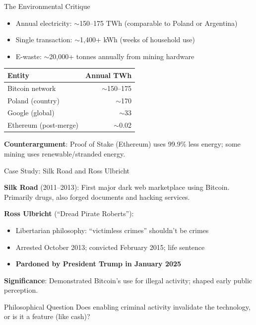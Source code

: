 ﻿\documentclass[aspectratio=169,11pt]{beamer}
\begin{document}
\begin{frame}{The Environmental Critique}
\begin{objectionbox}
\small
\begin{itemize}
    \item Annual electricity: $\sim$150--175 TWh (comparable to Poland or Argentina)
    \item Single transaction: $\sim$1,400+ kWh (weeks of household use)
    \item E-waste: $\sim$20,000+ tonnes annually from mining hardware
\end{itemize}
\end{objectionbox}

\vspace{-0.2em}
\begin{table}[h]
\centering
\scriptsize
\begin{tabular}{@{}lr@{}}
\toprule
\textbf{Entity} & \textbf{Annual TWh} \\
\midrule
Bitcoin network & $\sim$150--175 \\
Poland (country) & $\sim$170 \\
Google (global) & $\sim$33 \\
Ethereum (post-merge) & $\sim$0.02 \\
\bottomrule
\end{tabular}
\end{table}
\vspace{-0.3em}
\textbf{Counterargument}: Proof of Stake (Ethereum) uses 99.9\% less energy; some mining uses renewable/stranded energy.
\end{frame}

\begin{frame}{Case Study: Silk Road and Ross Ulbricht}
\begin{casestudybox}
\small
\textbf{Silk Road} (2011--2013): First major dark web marketplace using Bitcoin. Primarily drugs, also forged documents and hacking services.
\end{casestudybox}

\vspace{0.2em}
\textbf{Ross Ulbricht} (``Dread Pirate Roberts''):
\begin{itemize}
    \item Libertarian philosophy: ``victimless crimes'' shouldn't be crimes
    \item Arrested October 2013; convicted February 2015; life sentence
    \item \textbf{Pardoned by President Trump in January 2025}
\end{itemize}

\textbf{Significance}: Demonstrated Bitcoin's use for illegal activity; shaped early public perception.

\begin{alertblock}{Philosophical Question}
Does enabling criminal activity invalidate the technology, or is it a feature (like cash)?
\end{alertblock}
\end{frame}
\end{document}
